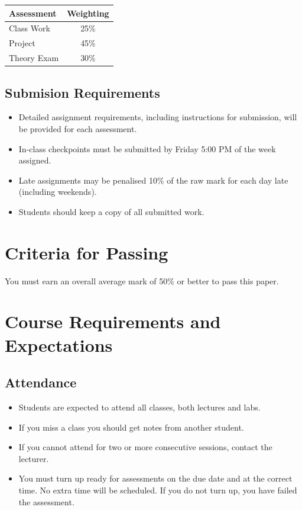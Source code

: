 \documentclass{article}
\begin{document}
\begin{tabular}{|l|c|}
\hline
Assessment &  Weighting \\ \hline
 Class Work & 25\% \\ \hline
 Project & 45\% \\ \hline
 Theory Exam & 30\% \\ \hline
\end{tabular}
\subsection*{Submision Requirements}
\begin{itemize}
	\item Detailed assignment requirements, including instructions for submission, will be provided for each assessment.
        \item In-class checkpoints must be submitted by Friday 5:00 PM of the week assigned.
	\item Late assignments may be penalised 10\% of the raw mark for each day late (including weekends).
	\item Students should keep a copy of all submitted work.
\end{itemize}

\section*{Criteria for Passing}
You must earn an overall average mark of 50\% or better to pass this paper.

\section*{Course Requirements and Expectations}
\subsection*{Attendance}
\begin{itemize}
 \item Students are expected to attend all classes, both lectures and labs.
 \item If you miss a class you should get notes from another student.
 \item If you cannot attend for two or more consecutive sessions, contact the lecturer.
 \item You must turn up ready for assessments on the due date and at the correct time. No extra time will be scheduled. If you do not turn up, you have failed the assessment.
\end{itemize}
\end{document}
